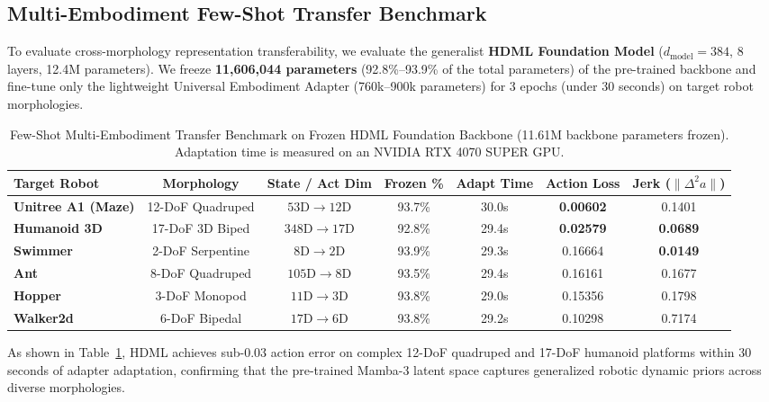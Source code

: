 \documentclass{article}
\begin{document}
\subsection{Multi-Embodiment Few-Shot Transfer Benchmark}
To evaluate cross-morphology representation transferability, we evaluate the generalist \textbf{HDML Foundation Model} ($d_{\text{model}}=384$, 8 layers, 12.4M parameters). We freeze \textbf{11,606,044 parameters} (92.8\%--93.9\% of the total parameters) of the pre-trained backbone and fine-tune only the lightweight Universal Embodiment Adapter (760k--900k parameters) for 3 epochs (under 30 seconds) on target robot morphologies.

\begin{table}[h]
\centering
\caption{Few-Shot Multi-Embodiment Transfer Benchmark on Frozen HDML Foundation Backbone (11.61M backbone parameters frozen). Adaptation time is measured on an NVIDIA RTX 4070 SUPER GPU.}
\label{tab:foundation_benchmark}
\small
\begin{tabular}{lcccccc}
\toprule
\textbf{Target Robot} & \textbf{Morphology} & \textbf{State / Act Dim} & \textbf{Frozen \%} & \textbf{Adapt Time} & \textbf{Action Loss} & \textbf{Jerk ($\|\Delta^2 a\|$)} \\
\midrule
\textbf{Unitree A1 (Maze)}   & 12-DoF Quadruped    & $53\text{D} \to 12\text{D}$ & 93.7\% & 30.0s & \textbf{0.00602} & 0.1401 \\
\textbf{Humanoid 3D}         & 17-DoF 3D Biped     & $348\text{D} \to 17\text{D}$ & 92.8\% & 29.4s & \textbf{0.02579} & \textbf{0.0689} \\
\textbf{Swimmer}             & 2-DoF Serpentine    & $8\text{D} \to 2\text{D}$   & 93.9\% & 29.3s & 0.16664 & \textbf{0.0149} \\
\textbf{Ant}                 & 8-DoF Quadruped     & $105\text{D} \to 8\text{D}$ & 93.5\% & 29.4s & 0.16161 & 0.1677 \\
\textbf{Hopper}              & 3-DoF Monopod       & $11\text{D} \to 3\text{D}$  & 93.8\% & 29.0s & 0.15356 & 0.1798 \\
\textbf{Walker2d}            & 6-DoF Bipedal       & $17\text{D} \to 6\text{D}$  & 93.8\% & 29.2s & 0.10298 & 0.7174 \\
\bottomrule
\end{tabular}
\end{table}

As shown in Table~\ref{tab:foundation_benchmark}, HDML achieves sub-0.03 action error on complex 12-DoF quadruped and 17-DoF humanoid platforms within 30 seconds of adapter adaptation, confirming that the pre-trained Mamba-3 latent space captures generalized robotic dynamic priors across diverse morphologies.
\end{document}
